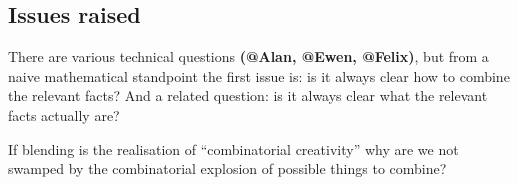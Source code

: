 \subsection{Issues raised}

There are various technical questions \textbf{(@Alan, @Ewen, @Felix)},
but from a naive mathematical standpoint the first issue is: is it
always clear how to combine the relevant facts?  And a related
question: is it always clear what the relevant facts actually are?

If blending is the realisation of ``combinatorial creativity'' why are
we not swamped by the combinatorial explosion of possible things to
combine?


